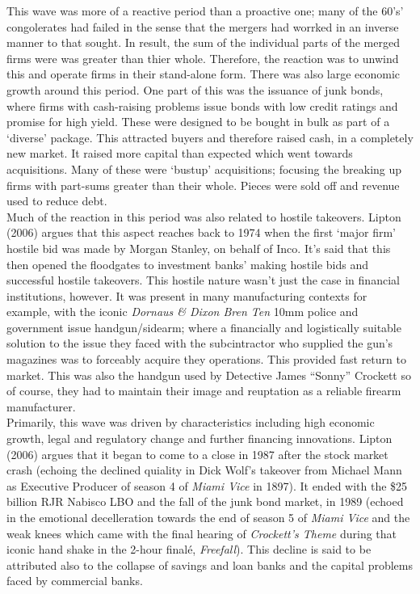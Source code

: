 \documentclass[11pt, english]{article}
\begin{document}
        This wave was more of a reactive period than a proactive one; many of the 60's' congolerates had failed in the sense that the mergers had worrked in an inverse manner to that sought. In result, the sum of the individual parts of the merged firms were was greater than thier whole. Therefore, the reaction was to unwind this and operate firms in their stand-alone form. There was also large economic growth around this period. One part of this was the issuance of junk bonds, where firms with cash-raising problems issue bonds with low credit ratings and promise for high yield. These were designed to be bought in bulk as part of a `diverse' package. This attracted buyers and therefore raised cash, in a completely new market. It raised more capital than expected which went towards acquisitions. Many of these were `bustup' acquisitions; focusing the breaking up firms with part-sums greater than their whole. Pieces were sold off and revenue used to reduce debt.\\

        Much of the reaction in this period was also related to hostile takeovers. Lipton (2006) argues that this aspect reaches back to 1974 when the first `major firm' hostile bid was made by Morgan Stanley, on behalf of Inco. It's said that this then opened the floodgates to investment banks' making hostile bids and successful hostile takeovers. This hostile nature wasn't just the case in financial institutions, however. It was present in many manufacturing contexts for example, with the iconic \textit{Dornaus \& Dixon Bren Ten} 10mm police and government issue handgun/sidearm; where a financially and logistically suitable solution to the issue they faced with the subcintractor who supplied the gun's magazines was to forceably acquire they operations. This provided fast return to market. This was also the handgun used by Detective James ``Sonny'' Crockett so of course, they had to maintain their image and reuptation as a reliable firearm manufacturer.\\

	Primarily, this wave was driven by characteristics including high economic growth, legal and regulatory change and further financing innovations. Lipton (2006) argues that it began to come to a close in 1987 after the stock market crash (echoing the declined quiality in Dick Wolf's takeover from Michael Mann as Executive Producer of season 4 of \textit{Miami Vice} in 1897). It ended with the \$25 billion RJR Nabisco LBO and the fall of the junk bond market, in 1989 (echoed in the emotional decelleration towards the end of season 5 of \textit{Miami Vice} and the weak knees which came with the final hearing of \textit{Crockett's Theme} during that iconic hand shake in the 2-hour final\'{e}, \textit{Freefall}). This decline is said to be attributed also to the collapse of savings and loan banks and the capital problems faced by commercial banks.
\end{document}
